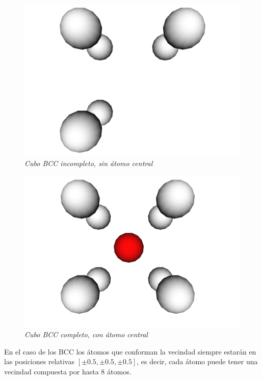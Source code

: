 \begin{figure}[ht]
  \centering
  \includegraphics[scale=.3]{images/BCC-incomplete-molecule}
  \caption{\em Cubo BCC incompleto, sin átomo central}
  \label{BCC-incomplete-molecule}
\end{figure}

\begin{figure}[ht]
  \centering
  \includegraphics[scale=.3]{images/BCC-complete-molecule}
  \caption{\em Cubo BCC completo, con átomo central}
  \label{BCC-complete-molecule}
\end{figure}

En el caso de los BCC los átomos que conforman la vecindad siempre estarán en las posiciones relativas $[\pm 0.5, \pm 0.5, \pm 0.5]$, es decir, cada átomo puede tener una vecindad compuesta por hasta 8 átomos.


